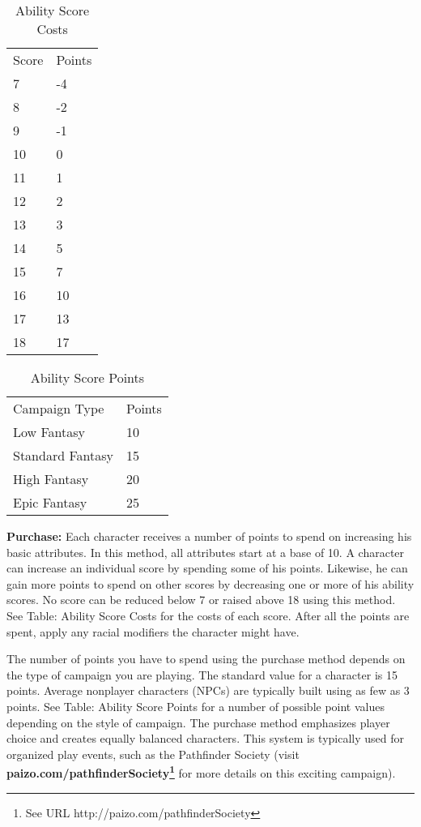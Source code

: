 \begin{table}[]
\caption{Ability Score Costs}
\begin{tabular}{ll}
Score & Points \\
7     & -4     \\
8     & -2     \\
9     & -1     \\
10    & 0      \\
11    & 1      \\
12    & 2      \\
13    & 3      \\
14    & 5      \\
15    & 7      \\
16    & 10     \\
17    & 13     \\
18    & 17    
\end{tabular}
\end{table}

\begin{table}[]
\caption{Ability Score Points}
\begin{tabular}{ll}
Campaign Type    & Points \\
Low Fantasy      & 10     \\
Standard Fantasy & 15     \\
High Fantasy     & 20     \\
Epic Fantasy     & 25    
\end{tabular}
\end{table}
				
\textbf{Purchase:} Each character receives a number of points to spend on increasing his basic attributes. In this method, all attributes start at a base of 10. A character can increase an individual score by spending some of his points. Likewise, he can gain more points to spend on other scores by decreasing one or more of his ability scores. No score can be reduced below 7 or raised above 18 using this method. See Table: Ability Score Costs for the costs of each score. After all the points are spent, apply any racial modifiers the character might have.
				
The number of points you have to spend using the purchase method depends on the type of campaign you are playing. The standard value for a character is 15 points. Average nonplayer characters (NPCs) are typically built using as few as 3 points. See Table: Ability Score Points for a number of possible point values depending on the style of campaign. The purchase method emphasizes player choice and creates equally balanced characters. This system is typically used for organized play events, such as the Pathfinder Society (visit \textbf{paizo.com/pathfinderSociety\footnote{See URL http://paizo.com/pathfinderSociety}} for more details on this exciting campaign).
				
